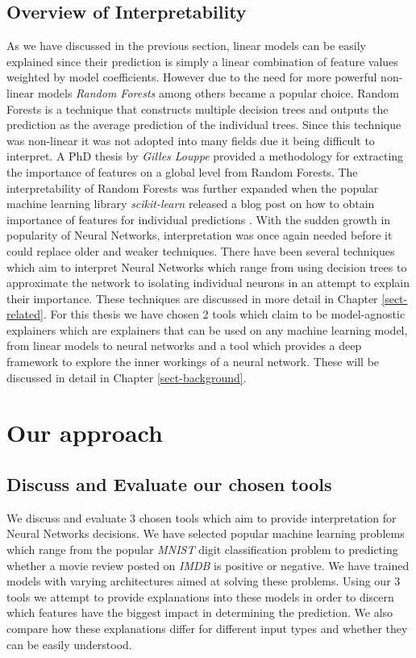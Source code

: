 \subsection{Overview of Interpretability}
As we have discussed in the previous section, linear models can be easily explained since their prediction is simply a linear combination of feature values weighted by model coefficients. However due to the need for more powerful non-linear models \emph{Random Forests} \cite{inbookb} among others  became a popular choice. Random Forests is a technique that constructs multiple decision trees and outputs the prediction as the average prediction of the individual trees. Since this technique was non-linear it was not adopted into many fields due it being difficult to interpret. A PhD thesis by \emph{Gilles Louppe} \cite{louppe2015understanding}  provided a methodology for extracting the  importance of features on a global level from Random Forests. The interpretability of Random Forests was further expanded when the popular machine learning library \emph{scikit-learn} released a blog post on how to obtain importance of features for individual predictions \cite{RandomData}. With the sudden growth in popularity of Neural Networks, interpretation was once again needed before it could replace older and weaker techniques. There have been several techniques which aim to interpret Neural Networks which range from using decision trees to approximate the network to isolating individual neurons in an attempt to explain their importance. These techniques are discussed in more detail in Chapter \ref{sect-related}. For this thesis we have chosen 2 tools which claim to be model-agnostic explainers which are explainers that can be used on any machine learning model, from linear models to neural networks and a tool which provides a deep framework to explore the inner workings of a neural network. These will be discussed in detail in Chapter \ref{sect-background}.

\section{Our approach}
\subsection{Discuss and Evaluate our chosen tools}
We discuss and evaluate 3 chosen tools which aim to provide interpretation for Neural Networks decisions. We have selected popular machine learning problems which range from the popular \emph{MNIST} digit classification problem to predicting whether a movie review posted on \emph{IMDB} is positive or negative. We have trained models with varying architectures aimed at solving these problems. Using our 3 tools we attempt to provide explanations into these models in order to discern which features have the biggest impact in determining the prediction. We also compare how these explanations differ for different input types and whether they can be easily understood.

